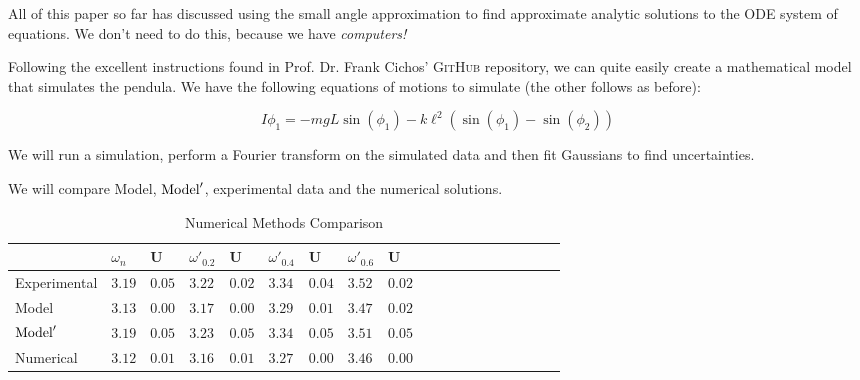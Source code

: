 \documentclass[aps,prl,reprint,10pt,amsmath,amssymb,superscriptaddress,a4paper, floatfix]{revtex4-2}
\begin{document}
All of this paper so far has discussed using the small angle approximation to find approximate analytic solutions to the ODE system of equations. We don't need to do this, because we have {\it{computers!}}

Following the excellent instructions found in Prof. Dr. Frank Cichos' \textsc{GitHub} repository\cite{note 2}, we can quite easily create a mathematical model that simulates the pendula. We have the following equations of motions to simulate (the other follows as before):

\begin{equation}
    I \phi_1 = -mgL \sin \left( \phi_1 \right) - k \ell^2 \left( \sin \left( \phi_1 \right) - \sin \left( \phi_2 \right) \right)
\end{equation}

We will run a simulation, perform a Fourier transform on the simulated data and then fit Gaussians to find uncertainties.

We will compare Model, $\textnormal{Model}'$, experimental data and the numerical solutions.

\begin{table}[h]
    \begin{tabular}{lllllllllllllllllll}
    \toprule
                            & $\omega_n$     & U            & $\omega'_0.2$  & U            & $\omega'_0.4$  & U            & $\omega'_0.6$  & U            & \\ \midrule
    Experimental            & $3.19$         & $0.05$       & $3.22$         & $0.02$       & $3.34$         & $0.04$       & $3.52$         & $0.02$       & \\ 
    Model                   & $3.13$         & $0.00$       & $3.17$         & $0.00$       & $3.29$         & $0.01$       & $3.47$         & $0.02$       & \\ 
    $\textnormal{Model}'$   & $3.19$         & $0.05$       & $3.23$         & $0.05$       & $3.34$         & $0.05$       & $3.51$         & $0.05$       & \\
    Numerical               & $3.12$         & $0.01$       & $3.16$         & $0.01$       & $3.27$         & $0.00$       & $3.46$         & $0.00$       & \\ \bottomrule
    \end{tabular}
    \caption{Numerical Methods Comparison}
\end{table}
\end{document}
